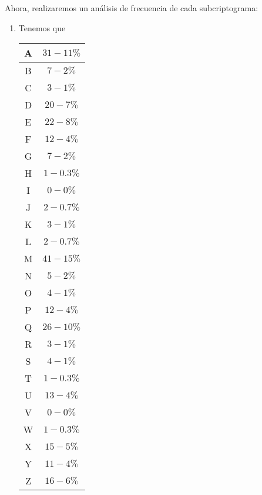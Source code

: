 \documentclass[letterpaper,11pt]{article}
\begin{document}
\begin{enumerate}
\begin{enumerate}
        Ahora, realizaremos un análisis de frecuencia de cada subcriptograma:
        \begin{enumerate}
            \item Tenemos que
            \begin{center}
                \begin{tabular}{|c|c|}
                \hline
                A & $31-11\%$ \\ \hline
                B & $7-2\%$ \\ \hline
                C & $3-1\%$ \\ \hline
                D & $20-7\%$ \\ \hline
                E & $22-8\%$ \\ \hline
                F & $12-4\%$ \\ \hline
                G & $7-2\%$ \\ \hline
                H & $1-0.3\%$ \\ \hline
                I & $0-0\%$ \\ \hline
                J & $2-0.7\%$ \\ \hline
                K & $3-1\%$ \\ \hline
                L & $2-0.7\%$ \\ \hline
                M & $41-15\%$ \\ \hline
                N & $5-2\%$ \\ \hline
                O & $4-1\%$ \\ \hline
                P & $12-4\%$\\ \hline
                Q & $26-10\%$ \\ \hline
                R & $3-1\%$ \\ \hline
                S & $4-1\%$ \\ \hline
                T & $1-0.3\%$ \\ \hline
                U & $13-4\%$ \\ \hline
                V & $0-0\%$ \\ \hline
                W & $1-0.3\%$ \\ \hline
                X & $15-5\%$ \\ \hline
                Y & $11-4\%$ \\ \hline
                Z & $16-6\%$ \\ \hline
                \end{tabular}
            \end{center}


\end{enumerate}
\end{enumerate}
\end{enumerate}
\end{document}
